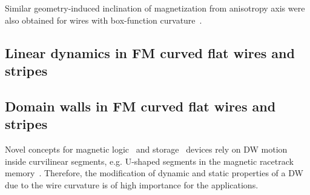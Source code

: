 \documentclass[runningheads]{llncs}
\begin{document}

Similar geometry-induced inclination of magnetization from anisotropy axis were also obtained for wires with box-function curvature~\cite{Gaididei18a}. 


\subsection{Linear dynamics in FM curved flat wires and stripes}\label{sec:linear_dyn}

\subsection{Domain walls in FM curved flat wires and stripes}\label{sec:DW_dyn}

\begin{tcolorbox}[fonttitle=\sffamily\bfseries\large,title=Some introduction...]
	Novel concepts for magnetic logic~\cite{Allwood05} and storage~\cite{Parkin08} devices rely on DW motion inside curvilinear segments, e.g. U-shaped segments in the magnetic racetrack memory~\cite{Parkin08}. Therefore, the modification of dynamic and static properties of a DW due to the wire curvature is of high importance for the applications.
\end{tcolorbox}
\end{document}
